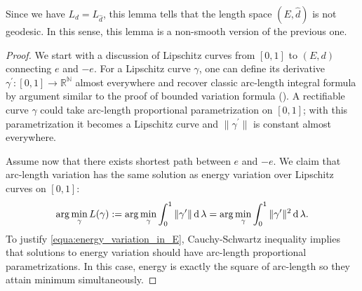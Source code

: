 Since we have $ L_d = L_{\hat{d}}$,
this lemma tells that the length space $(E, \hat{d})$ is not geodesic.
In this sense, this lemma is a non-smooth version of the previous one.

\begin{proof}
	We start with a discussion of Lipschitz curves from $[0,1]$ to $(E,d)$ connecting $e$ and $-e$.
	For a Lipschitz curve $\gamma$,
	one can define its derivative $\gamma^\prime: [0,1] \rightarrow \mathbb{R}^\mathbb{N}$ almost everywhere
	and recover classic arc-length integral formula by argument similar to the proof of bounded variation formula
	(\cite[Section 5.3]{Bogachev2007}).
	A rectifiable curve $\gamma$ could take arc-length proportional parametrization on $[0,1]$;
	with this parametrization
	it becomes a Lipschitz curve and $\| \gamma^\prime \|$ is constant almost everywhere.

	Assume now that there exists shortest path between $e$ and $-e$.
	We claim that arc-length variation has the same solution as energy variation
	over Lipschitz curves on $[0,1]$:
	\begin{equation}
		\label{equa:energy_variation_in_E}
		\arg \min_{\gamma} L (\gamma) :=
		\arg \min_{\gamma} \int_{0}^{1} \| \gamma^\prime \| \operatorname{d} \lambda =
		\arg \min_{\gamma} \int_{0}^{1} \| \gamma^\prime \| ^2 \operatorname{d} \lambda.
	\end{equation}
	To justify \cref{equa:energy_variation_in_E},
	Cauchy-Schwartz inequality implies that
	solutions to energy variation should have arc-length proportional parametrizations.
	In this case, energy is exactly the square of arc-length so they attain minimum simultaneously.


\end{proof}
